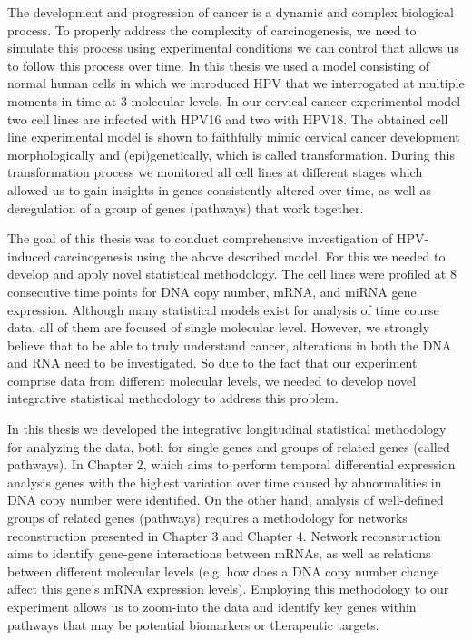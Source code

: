 \begin{summary}
The development and progression of cancer is a dynamic and complex biological process. To properly address the complexity of carcinogenesis, we need to simulate this process using experimental conditions we can control that allows us to follow this process over time. In this thesis we used a model consisting of normal human cells in which we introduced  HPV that we interrogated at multiple moments in time at 3 molecular levels. In our cervical cancer experimental model two cell lines are infected with HPV16 and two with HPV18. The obtained cell line experimental model is shown to faithfully mimic cervical cancer development morphologically and (epi)genetically, which is called transformation. During this transformation process we monitored all cell lines at different stages which allowed us to gain insights in genes consistently altered over time, as well as deregulation of a group of genes (pathways) that work together. 

The goal of this thesis was to conduct comprehensive investigation of HPV-induced carcinogenesis using the above described model. For this we needed to develop and apply novel statistical methodology.  The cell lines were profiled at 8 consecutive time points for DNA copy number, mRNA, and miRNA gene expression. Although many statistical models exist for analysis of time course data, all of them are focused of single molecular level. However, we strongly believe that to be able to truly understand cancer, alterations in both the DNA and RNA need to be investigated. So due to the fact that our experiment comprise data from different molecular levels, we needed to develop novel integrative statistical methodology to address this problem.
 
 In this thesis we developed the integrative longitudinal statistical methodology for analyzing the data, both for single genes and groups of related genes (called pathways). In Chapter 2, which aims to perform temporal differential expression analysis genes with the highest variation over time caused by abnormalities in DNA copy number were identified. On the other hand, analysis of well-defined groups of related genes (pathways) requires a methodology for networks reconstruction presented in Chapter 3 and Chapter 4. Network reconstruction aims to identify gene-gene interactions between mRNAs, as well as relations between different molecular levels (e.g. how does a DNA copy number change affect this gene's mRNA expression levels). Employing this methodology to our experiment allows us to zoom-into the data and identify key genes within pathways that may be  potential biomarkers or therapeutic targets.


\end{summary}
